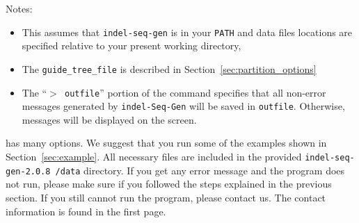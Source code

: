 \documentclass[10pt]{article}
\newcommand{\version}{2.0.8 }
\newcommand{\iSGcurrent}{indel-seq-gen-\version }
\begin{document}
 \noindent Notes:
 \begin{itemize}
 \item This assumes that {\tt indel-seq-gen} is in your {\tt PATH} and data files locations are specified relative to your present working directory,
 \item The {\tt guide\_tree\_file} is described in Section~\ref{sec:partition_options}
 \item The ``{\tt $>$ outfile}'' portion of the command  specifies that all non-error messages generated by {\tt indel-Seq-Gen} will be saved in {\tt outfile}. Otherwise, messages will be displayed on the screen. 

 \end{itemize}

  has many options. We suggest that you run some of the examples shown in Section~\ref{sec:example}. All necessary files are included in the provided {\tt \iSGcurrent/data} directory.  If you get any error message and the program does not run, please make sure if you followed the steps explained in the previous section. If you still cannot run the program, please contact us. The contact information is found in the first page.
\end{document}
